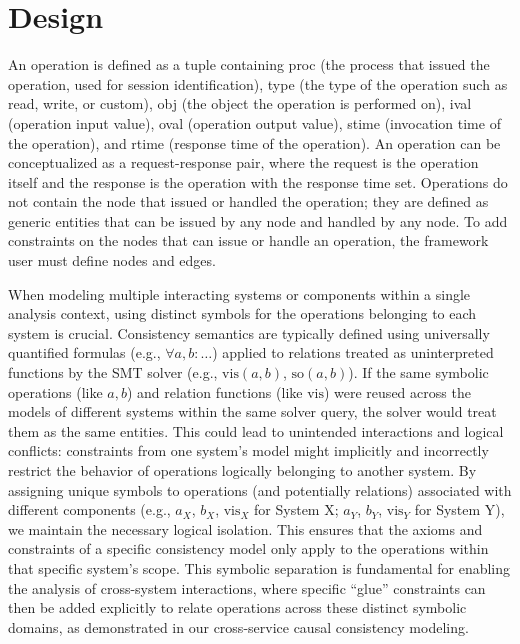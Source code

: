 \section{Design}


{\color{red}An operation is defined as a tuple containing proc (the
  process that issued the operation, used for session identification),
  type (the type of the operation such as read, write, or custom), obj
  (the object the operation is performed on), ival (operation input
  value), oval (operation output value), stime (invocation time of the
  operation), and rtime (response time of the operation). An operation
  can be conceptualized as a request-response pair, where the request
  is the operation itself and the response is the operation with the
  response time set. Operations do not contain the node that issued or
  handled the operation; they are defined as generic entities that can
  be issued by any node and handled by any node. To add constraints on
  the nodes that can issue or handle an operation, the framework user
must define nodes and edges.}

When modeling multiple interacting systems or components within a
single analysis context, using distinct symbols for the operations
belonging to each system is crucial. Consistency semantics are
typically defined using universally quantified formulas (e.g.,
$\forall a, b: \dots$) applied to relations treated as uninterpreted
functions by the SMT solver (e.g., $\text{vis}(a, b)$,
$\text{so}(a, b)$). If the same symbolic operations (like $a, b$)
and relation functions (like $\text{vis}$) were reused across the
models of different systems within the same solver query, the solver
would treat them as the same entities. This could lead to
unintended interactions and logical conflicts: constraints from one
system's model might implicitly and incorrectly restrict the behavior
of operations logically belonging to another system. By assigning
unique symbols to operations (and potentially relations) associated
with different components (e.g., $a_X$, $b_X$, $\text{vis}_X$ for
System X; $a_Y$, $b_Y$, $\text{vis}_Y$ for System Y), we maintain
the necessary logical isolation. This ensures that the axioms and
constraints of a specific consistency model only apply to the
operations within that specific system's scope. This symbolic
separation is fundamental for enabling the analysis of
cross-system interactions, where specific ``glue''
constraints can then be added explicitly to relate operations across
these distinct symbolic domains, as demonstrated in our cross-service causal
consistency modeling.

